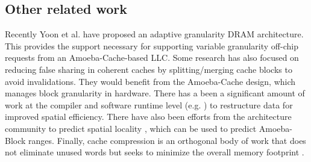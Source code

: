 \subsection{Other related work}

Recently Yoon et al. have proposed an adaptive granularity DRAM architecture\cite{Yoon_Jeong_Erez_2011}. This provides the support necessary for supporting variable granularity off-chip requests from an Amoeba-Cache-based LLC. Some research \cite{Dubnicki:1992:ABS:139669.139725,Choi:2011:DRM:2120965.2121416} has also focused on reducing false sharing in coherent caches by splitting/merging cache blocks to avoid invalidations. They would benefit from the Amoeba-Cache design, which manages block granularity in hardware. There has a been a significant amount of work at the compiler and software runtime level (e.g. \cite{Chilimbi-Hill-pldi-1999}) to restructure data for improved spatial efficiency. There have also been efforts from the architecture community to predict spatial locality \cite{pujara-hpca-2006, Watkins:2008:RCB:1505816.1505849, kumar-isca-1998, yoon2012dgms}, which can be used to predict Amoeba-Block ranges. Finally, cache compression is an orthogonal body of work that does not eliminate unused words but seeks to minimize the overall memory footprint \cite{AlameldeenPHD}.

